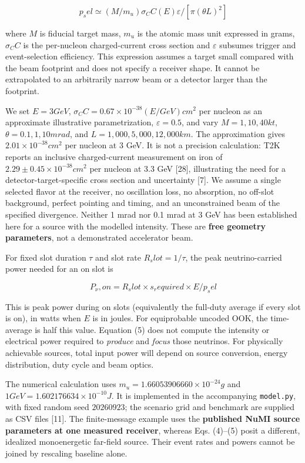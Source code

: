 \documentclass[
]{article}
\begin{document}
\[
p_sel ≃ (M/m_u) σ_CC(E) ε / [π(θL)^{2}] \tag{4}
\]

where \(M\) is fiducial target mass, \(m_u\) is the atomic mass unit
expressed in grams, \({\sigma}_CC\) is the per-nucleon charged-current
cross section and \({\varepsilon}\) subsumes trigger and event-selection
efficiency. This expression assumes a target small compared with the
beam footprint and does not specify a receiver shape. It cannot be
extrapolated to an arbitrarily narrow beam or a detector larger than the
footprint.

We set \(E = 3 GeV\),
\({\sigma}_CC = 0.67 \times 10^{-38}(E/GeV) cm^{2}\) per nucleon as an
approximate illustrative parametrization, \({\varepsilon} = 0.5\), and
vary \(M = 1, 10, 40 kt\), \({\theta} = 0.1, 1, 10 mrad\), and
\(L = 1,000, 5,000, 12,000 km\). The approximation gives
\(2.01 \times 10^{-38} cm^{2}\) per nucleon at 3 GeV. It is not a
precision calculation: T2K reports an inclusive charged-current
measurement on iron of \(2.29 ± 0.45 \times 10^{-38} cm^{2}\) per
nucleon at 3.3 GeV {[}28{]}, illustrating the need for a
detector-target-specific cross section and uncertainty {[}7{]}. We
assume a single selected flavor at the receiver, no oscillation loss, no
absorption, no off-slot background, perfect pointing and timing, and an
unconstrained beam of the specified divergence. Neither 1 mrad nor 0.1
mrad at 3 GeV has been established here for a source with the modelled
intensity. These are \textbf{free geometry parameters}, not a
demonstrated accelerator beam.

For fixed slot duration \({\tau}\) and slot rate \(R_slot = 1/{\tau}\),
the peak neutrino-carried power needed for an on slot is

\[
P_ν,on = R_slot × s_required × E / p_sel \tag{5}
\]

This is peak power during on slots (equivalently the full-duty average
if every slot is on), in watts when \(E\) is in joules. For equiprobable
uncoded OOK, the time-average is half this value. Equation (5) does not
compute the intensity or electrical power required to \emph{produce} and
\emph{focus} those neutrinos. For physically achievable sources, total
input power will depend on source conversion, energy distribution, duty
cycle and beam optics.

The numerical calculation uses \(m_u = 1.66053906660 \times 10^{-24} g\)
and \(1 GeV = 1.602176634 \times 10^{-10} J\). It is implemented in the
accompanying \texttt{model.py}, with fixed random seed \(20260923\); the
scenario grid and benchmark are supplied as CSV files {[}11{]}. The
finite-message example uses the \textbf{published NuMI source parameters
at one measured receiver}, whereas Eqs. (4)--(5) posit a different,
idealized monoenergetic far-field source. Their event rates and powers
cannot be joined by rescaling baseline alone.
\end{document}
